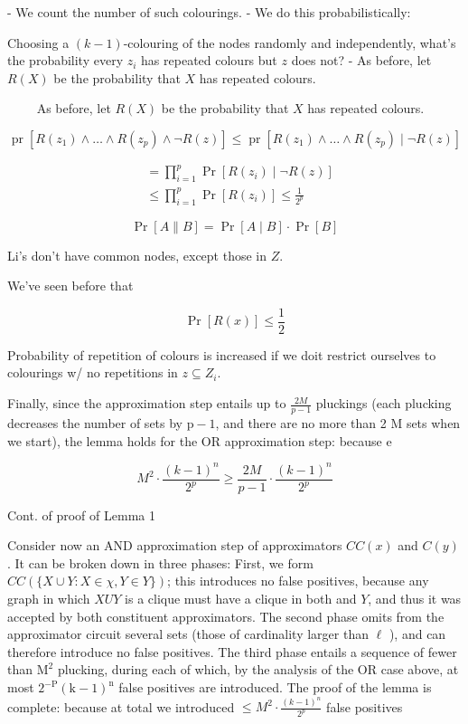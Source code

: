 - We count the number of such colourings.
- We do this probabilistically:

Choosing a $(k-1)$-colouring of the nodes randomly and independently, what's the probability every $z_i$ has repeated colours but $z$ does not?
- As before, let $R(X)$ be the probability that $X$ has repeated colours.


$\qquad$ As before, let $R(X)$ be the probability that $X$ has repeated colours.

$$
\operatorname{pr}\left[R\left(z_1\right) \wedge \ldots \wedge R\left(z_p\right) \wedge \neg R(z)\right] \leqslant \operatorname{pr}\left[R\left(z_1\right) \wedge \ldots \wedge R\left(z_p\right) \mid \neg R(z)\right]$$

$$
\begin{aligned}
& =\prod_{i=1}^p \operatorname{Pr}\left[R\left(z_i\right) \mid \neg R(z)\right] \\
& \leqslant \prod_{i=1}^p \operatorname{Pr}\left[R\left(z_i\right)\right]
\leqslant \frac{1}{2^p}
\end{aligned}
$$

$$
\operatorname{Pr}[A \| B]=\operatorname{Pr}[A \mid B] \cdot \operatorname{Pr}[B]
$$


Li's don't have common nodes, except those in $Z$.

We've seen before that

$$
\operatorname{Pr}[R(x)] \leqslant \frac{1}{2}
$$

Probability of repetition of colours is increased if we doit restrict ourselves to colourings w/ no repetitions in $z \subseteq Z_i$.


Finally, since the approximation step entails up to $\frac{2 M}{p-1}$ pluckings (each plucking decreases the number of sets by $\mathrm{p}-1$, and there are no more than 2 M sets when we start), the lemma holds for the OR approximation step: because e

$$
M^2 \cdot \frac{(k-1)^n}{2^p} \geq \frac{2 M}{p-1} \cdot \frac{(k-1)^n}{2^p}
$$


Cont. of proof of Lemma 1

Consider now an AND approximation step of approximators $C C(x)$ and $C(y)$. It can be broken down in three phases: First, we form $C C(\{X \cup Y: X \in \chi, Y \in Y\})$; this introduces no false positives, because any graph in which $X U Y$ is a clique must have a clique in both and $Y$, and thus it was accepted by both constituent approximators. The second phase omits from the approximator circuit several sets (those of cardinality larger than $\ell$ ), and can therefore introduce no false positives. The third phase entails a sequence of fewer than $\mathrm{M}^2$ plucking, during each of which, by the analysis of the OR case above, at most $2^{-\mathrm{P}}(\mathrm{k}-1)^{\mathrm{n}}$ false positives are introduced. The proof of the lemma is complete: because at total we introduced $\leq M^2 \cdot \frac{(k-1)^n}{2^p}$ false positives



